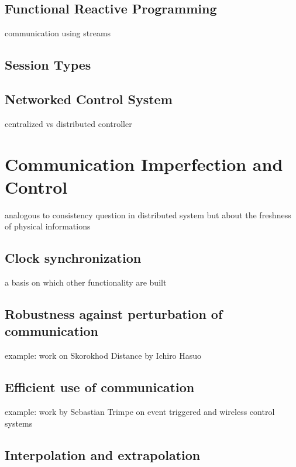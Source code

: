 \documentclass[
graybox,
envcountchap
]{svmult}
\begin{document}
\begin{bibunit}
    \subsection{Functional Reactive Programming}

    communication using streams

    \subsection{Session Types}


    \subsection{Networked Control System}

    centralized vs distributed controller

\section{Communication Imperfection and Control} %

    analogous to consistency question in distributed system but about the freshness of physical informations

    \subsection{Clock synchronization}

    a basis on which other functionality are built

    \subsection{Robustness against perturbation of communication}

    example: work on Skorokhod Distance by Ichiro Hasuo

    \subsection{Efficient use of communication}

    example: work by Sebastian Trimpe on event triggered and wireless control systems

    \subsection{Interpolation and extrapolation}


\end{bibunit}
\end{document}
